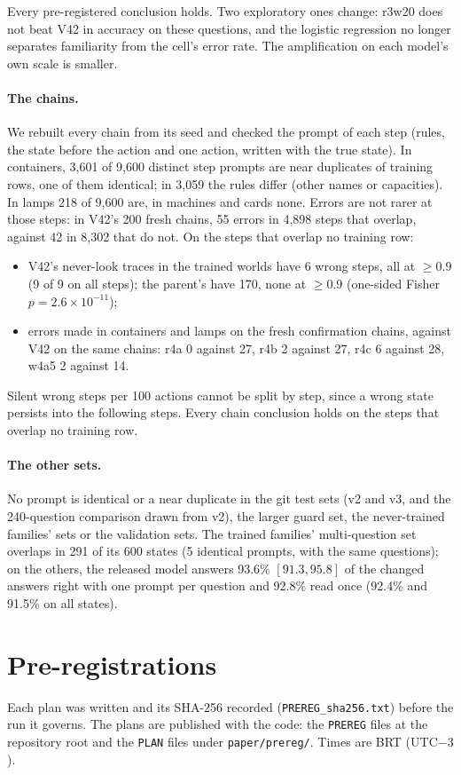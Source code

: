 \documentclass[11pt]{article}
\begin{document}
Every pre-registered conclusion holds. Two exploratory ones change: r3w20 does not beat V42 in accuracy on these
questions, and the logistic regression no longer separates familiarity from the cell's error rate. The amplification on
each model's own scale is smaller.

\paragraph{The chains.} We rebuilt every chain from its seed and checked the prompt of each step (rules, the state
before the action and one action, written with the true state). In containers, 3,601 of 9,600 distinct step prompts
are near duplicates of training rows, one of them identical; in 3,059 the rules differ (other names or capacities).
In lamps 218 of 9,600 are, in machines and cards none. Errors are not rarer at those steps: in V42's 200 fresh chains,
55 errors in 4,898 steps that overlap, against 42 in 8,302 that do not. On the steps that overlap no training row:
\begin{itemize}
  \item V42's never-look traces in the trained worlds have 6 wrong steps, all at $\ge 0.9$ (9 of 9 on all steps); the
  parent's have 170, none at $\ge 0.9$ (one-sided Fisher $p = 2.6\times10^{-11}$);
  \item errors made in containers and lamps on the fresh confirmation chains, against V42 on the same chains: r4a 0
  against 27, r4b 2 against 27, r4c 6 against 28, w4a5 2 against 14.
\end{itemize}
Silent wrong steps per 100 actions cannot be split by step, since a wrong state persists into the following steps.
Every chain conclusion holds on the steps that overlap no training row.

\paragraph{The other sets.} No prompt is identical or a near duplicate in the git test sets (v2 and v3, and the
240-question comparison drawn from v2), the larger guard set, the never-trained families' sets or the validation sets.
The trained families' multi-question set overlaps in 291 of its 600 states (5 identical prompts, with the same
questions); on the others, the released model answers 93.6\% $[91.3, 95.8]$ of the changed answers right with one
prompt per question and 92.8\% read once (92.4\% and 91.5\% on all states).

\section{Pre-registrations}\label{app:prereg}
Each plan was written and its SHA-256 recorded (\texttt{PREREG\_sha256.txt}) before the run it governs. The plans are
published with the code: the \texttt{PREREG} files at the repository root and the \texttt{PLAN} files under
\texttt{paper/prereg/}. Times are BRT (UTC$-3$).
\end{document}
